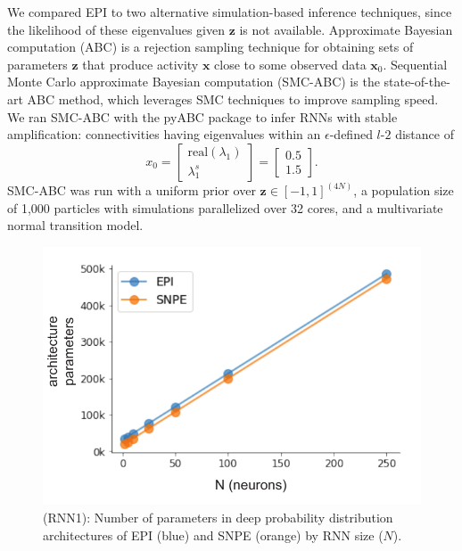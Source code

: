 \documentclass[11pt]{article}
\begin{document}
We compared EPI to two alternative simulation-based inference techniques, since the likelihood of these eigenvalues given $\mathbf{z}$ is not available.
Approximate Bayesian computation (ABC) \cite{beaumont2002approximate} is a rejection sampling technique for obtaining sets of parameters $\mathbf{z}$ that produce activity $\mathbf{x}$ close to some observed data $\mathbf{x}_0$.
Sequential Monte Carlo approximate Bayesian computation (SMC-ABC) is the state-of-the-art ABC method, which leverages SMC techniques to improve sampling speed.
We ran SMC-ABC with the pyABC package \cite{klinger2018pyabc} to infer RNNs with stable amplification: connectivities having eigenvalues within an $\epsilon$-defined $l$-$2$ distance of
\begin{equation}\label{eq:stab_amp_x0}
x_0 = \begin{bmatrix} \text{real}(\lambda_1) \\ \lambda^s_1 \end{bmatrix} = \begin{bmatrix} 0.5 \\ 1.5 \end{bmatrix}.
\end{equation}
SMC-ABC was run with a uniform prior over $\mathbf{z} \in \left[-1, 1 \right]^{(4N)}$, a population size of 1,000 particles with simulations parallelized over 32 cores, and a multivariate normal transition model.

\begin{figure}
\begin{center}
\includegraphics[scale=0.7]{figures/figRNN1/figRNN1.pdf}
\end{center}
\caption{\small (RNN1): 
Number of parameters in deep probability distribution architectures of EPI (blue) and SNPE (orange) by RNN size ($N$).
}
\label{fig:RNN1}
\end{figure}
\end{document}
